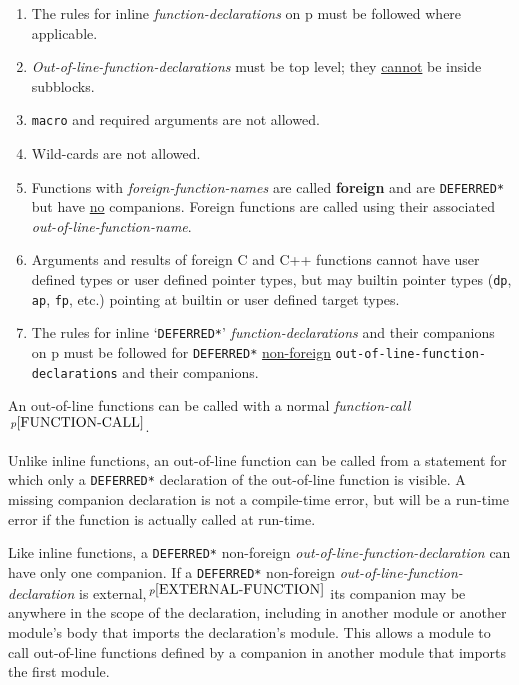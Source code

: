 \documentclass[12pt]{article}
\newcommand{\key}[1]{{\rm \bfseries #1}}
\newcommand{\pagref}[1]{p\pageref{#1}}
\newcommand{\pagnote}[1]{$\,^{p\pageref{#1}}$}
\newenvironment{indpar}[1][0.3in]%
	{\begin{list}{}%
		     {\setlength{\itemsep}{0in}%
		      \setlength{\topsep}{0in}%
		      \setlength{\parsep}{1ex}%
		      \setlength{\labelwidth}{#1}%
		      \setlength{\leftmargin}{#1}%
		      \addtolength{\leftmargin}{\labelsep}}%
	 \item}%
	{\end{list}}
\begin{document}
\begin{indpar}
\begin{enumerate}
\item
The rules for inline {\em function-declarations} on
\pagref{FUNCTION-DECLARATION} must be followed where applicable.
\item
{\em Out-of-line-function-declarations} must be top level; they
\underline{cannot} be inside subblocks.
\item
{\tt macro} and required arguments are not allowed.
\item
Wild-cards are not allowed.
\item Functions with {\em foreign-function-names} are called \key{foreign}
and are {\tt *DEFERRED*} but have \underline{no} companions.
Foreign functions are called using
their associated {\em out-of-line-function-name}.
\item
Arguments and results of foreign C and C++ functions cannot
have user defined types or user defined pointer types,
but may builtin pointer types ({\tt dp}, {\tt ap}, {\tt fp}, etc.)
pointing at builtin or user defined target types.
\item
The rules for inline `{\tt *DEFERRED*}'
{\em function-declarations} and
their companions on \pagref{COMPANION-DECLARATION}
must be followed for
{\tt *DEFERRED*} \underline{non-foreign}
{\tt out-of-line-function-de\-clar\-ations}
and their companions.
\end{enumerate}
\end{indpar}

An out-of-line functions can be called with a normal
{\em function-call}\pagnote{FUNCTION-CALL}.

Unlike inline functions, an out-of-line function can
be called from a statement for which only a {\tt *DEFERRED*} declaration
of the out-of-line function is visible.  A missing companion
declaration is not a compile-time error, but will be a
run-time error if the function is actually called at run-time.

Like inline functions, a {\tt *DEFERRED*}
non-foreign {\em out-of-line-function-declaration}
can have only one companion.
If\label{OUT-OF-LINE-EXTERNAL-COMPANION}
a {\tt *DEFERRED*} non-foreign {\em out-of-line-function-declaration}
is ex\-ternal,\pagnote{EXTERNAL-FUNCTION}
its companion may be anywhere in the scope of the declaration,
including in another module or another module's body that imports
the declaration's module.
This allows a module to call out-of-line functions defined by
a companion in another module that imports the first module.
\end{document}
